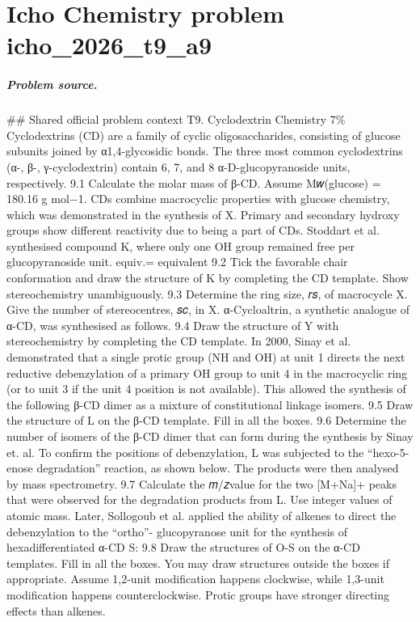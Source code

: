 
\chapter{Icho Chemistry problem icho\_2026\_t9\_a9}
\label{ch:IChO2026Problems_problem_icho_2026_t9_a9}

\paragraph{Problem source.}
\#\# Shared official problem context
T9. Cyclodextrin Chemistry 7\% Cyclodextrins (CD) are a family of cyclic oligosaccharides, consisting of glucose subunits joined by α1,4-glycosidic bonds. The three most common cyclodextrins (α-, β-, γ-cyclodextrin) contain 6, 7, and 8 α-D-glucopyranoside units, respectively. 9.1 Calculate the molar mass of β-CD. Assume M𝑤(glucose) = 180.16 g mol−1. CDs combine macrocyclic properties with glucose chemistry, which was demonstrated in the synthesis of X. Primary and secondary hydroxy groups show different reactivity due to being a part of CDs. Stoddart et al. synthesised compound K, where only one OH group remained free per glucopyranoside unit. equiv.= equivalent 9.2 Tick the favorable chair conformation and draw the structure of K by completing the CD template. Show stereochemistry unambiguously. 9.3 Determine the ring size, 𝑟𝑠, of macrocycle X. Give the number of stereocentres, 𝑠𝑐, in X. α-Cycloaltrin, a synthetic analogue of α-CD, was synthesised as follows. 9.4 Draw the structure of Y with stereochemistry by completing the CD template. In 2000, Sinay et al. demonstrated that a single protic group (NH and OH) at unit 1 directs the next reductive debenzylation of a primary OH group to unit 4 in the macrocyclic ring (or to unit 3 if the unit 4 position is not available). This allowed the synthesis of the following β-CD dimer as a mixture of constitutional linkage isomers. 9.5 Draw the structure of L on the β-CD template. Fill in all the boxes. 9.6 Determine the number of isomers of the β-CD dimer that can form during the synthesis by Sinay et. al. To confirm the positions of debenzylation, L was subjected to the “hexo-5-enose degradation” reaction, as shown below. The products were then analysed by mass spectrometry. 9.7 Calculate the 𝑚/𝑧value for the two [M+Na]+ peaks that were observed for the degradation products from L. Use integer values of atomic mass. Later, Sollogoub et al. applied the ability of alkenes to direct the debenzylation to the “ortho”- glucopyranose unit for the synthesis of hexadifferentiated α-CD S: 9.8 Draw the structures of O-S on the α-CD templates. Fill in all the boxes. You may draw structures outside the boxes if appropriate. Assume 1,2-unit modification happens clockwise, while 1,3-unit modification happens counterclockwise. Protic groups have stronger directing effects than alkenes.

